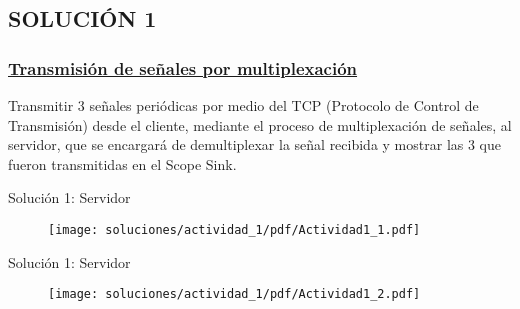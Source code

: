 \subsection{SOLUCIÓN 1}

\begin{frame}
	
	
	\frametitle{\underline{\textbf{Transmisión de señales por multiplexación}}}
	
	Transmitir 3 señales periódicas por medio del TCP (Protocolo de 	Control de Transmisión) desde el cliente, mediante el proceso de multiplexación de señales, al 	servidor, que se encargará de demultiplexar la señal recibida y mostrar las 3 que fueron  	transmitidas en el Scope Sink.\vspace{2mm}
	
	
\end{frame}


\begin{frame}{Solución 1: Servidor}
\begin{figure}[H]
	\vspace{-3mm}
	\centering
	\texttt{[image: soluciones/actividad\_1/pdf/Actividad1\_1.pdf]}
\end{figure}
\end{frame}

\begin{frame}{Solución 1: Servidor }
\begin{figure}[H]
	\vspace{-3mm}
	\centering
	\texttt{[image: soluciones/actividad\_1/pdf/Actividad1\_2.pdf]}
\end{figure}
\end{frame}

